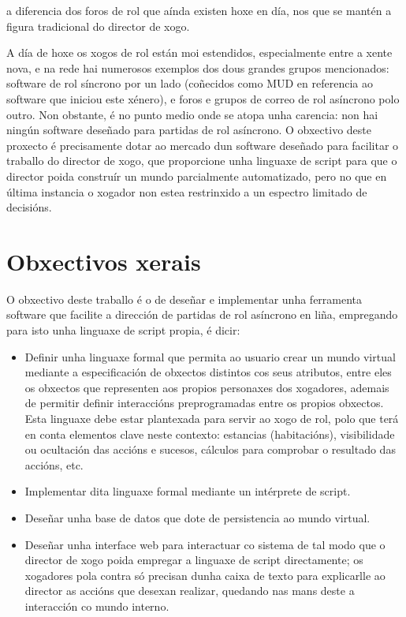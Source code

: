 a diferencia dos foros de rol que aínda existen hoxe en día, nos que se mantén a
figura tradicional do director de xogo.
\par
A día de hoxe os xogos de rol están moi estendidos, especialmente entre a xente
nova, e na rede hai numerosos exemplos dos dous grandes grupos mencionados:
software de rol síncrono por un lado (coñecidos como MUD en referencia ao
software que iniciou este xénero), e foros e grupos de correo de rol asíncrono
polo outro. Non obstante, é no punto medio onde se atopa unha carencia: non hai
ningún software deseñado para partidas de rol asíncrono. O obxectivo deste
proxecto é precisamente dotar ao mercado dun software deseñado para facilitar o
traballo do director de xogo, que proporcione unha linguaxe de script para que o
director poida construír un mundo parcialmente automatizado, pero no que en
última instancia o xogador non estea restrinxido a un espectro limitado de
decisións.

\section{Obxectivos xerais}
O obxectivo deste traballo é o de deseñar e implementar unha ferramenta software
que facilite a dirección de partidas de rol asíncrono en liña, empregando para
isto unha linguaxe de script propia, é dicir:
\begin{itemize}
  \item Definir unha linguaxe formal que permita ao usuario crear un mundo virtual
  mediante a especificación de obxectos distintos cos seus atributos, entre eles os obxectos que representen
  aos propios personaxes dos xogadores, ademais de permitir definir interaccións preprogramadas
  entre os propios obxectos. Esta linguaxe debe estar plantexada para servir ao xogo de rol, polo
  que terá en conta elementos clave neste contexto: estancias (habitacións), visibilidade ou
  ocultación das accións e sucesos, cálculos para comprobar o resultado das accións, etc.
  \item Implementar dita linguaxe formal mediante un intérprete de script.
  \item Deseñar unha base de datos que dote de persistencia ao mundo virtual.
  \item Deseñar unha interface web para interactuar co sistema de tal modo que o
  director de xogo poida empregar a linguaxe de script directamente; os xogadores pola contra só precisan dunha caixa de
  texto para explicarlle ao director as accións que desexan realizar, quedando nas mans deste a
  interacción co mundo interno.
\end{itemize}

